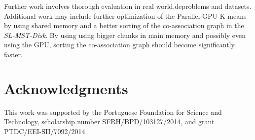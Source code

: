 \documentclass[a4paper,twoside]{article}
\begin{document}
Further work involves thorough evaluation in real world.deproblems and datasets.
Additional work may include further optimization of the Parallel GPU K-means by using shared memory and a better sorting of the co-association graph in the \emph{SL-MST-Disk}.
By using using bigger chunks in main memory and possibly even using the GPU, sorting the co-association graph should become significantly faster.

\section*{Acknowledgments}
This work was supported by the Portuguese Foundation for Science and Technology, scholarship number SFRH/BPD/103127/2014, and grant PTDC/EEI-SII/7092/2014.



{\small
}

\vfill
\end{document}
